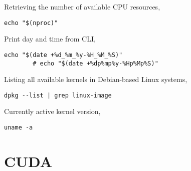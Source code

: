 \documentclass[12pt, a4paper]{scrbook}
\numberwithin{equation}{section}
\theoremstyle{definition}
\theoremstyle{definition}
\begin{document}
	Retrieving the number of available CPU resources,
	
	\begin{lstlisting}[style=mystylebash, label=alg:nproc, xleftmargin=\parindent]
		echo "$(nproc)"
	\end{lstlisting}

	Print day and time from CLI,
	
	\begin{lstlisting}[style=mystylebash, label=alg:cli_date, xleftmargin=\parindent]
		echo "$(date +%d_%m_%y-%H_%M_%S)"
		# echo "$(date +%dp%mp%y-%Hp%Mp%S)"
	\end{lstlisting}

	Listing all available kernels in Debian-based Linux systems, 
	
	\begin{lstlisting}[style=mystylebash, label=alg:ubuntu_kernel, xleftmargin=\parindent]
		dpkg --list | grep linux-image
	\end{lstlisting}
	
	Currently active kernel version,
	
	\begin{lstlisting}[style=mystylebash, label=alg:ubuntu_kernel__current, xleftmargin=\parindent]
		uname -a
	\end{lstlisting}

	\section{CUDA}
	
\end{document}
